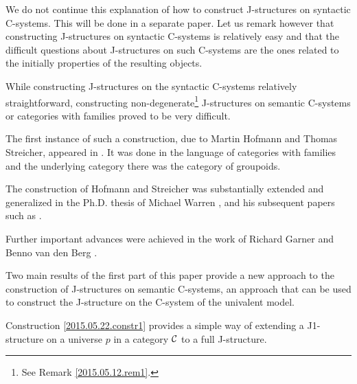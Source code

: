 \documentclass[12pt]{article}
\newcommand{\comment}[1]{}
\begin{document}
We do not continue this explanation of how to construct J-structures on syntactic C-systems. This will be done in a separate paper. Let us remark however that constructing J-structures on syntactic C-systems is relatively easy and that the difficult questions about J-structures on such C-systems are the ones related to the initially properties of the resulting objects. 

While constructing J-structures on the syntactic C-systems relatively straightforward, constructing non-degenerate\footnote{See Remark \ref{2015.05.12.rem1}.} J-structures on semantic C-systems or categories with families proved to be very difficult.

The first instance of such a construction, due to Martin Hofmann and Thomas Streicher, appeared in \cite{Hofmann1}. It was done in the language of categories with families and the underlying category there was the category of groupoids. 

The construction of Hofmann and Streicher was substantially extended and generalized in the Ph.D. thesis of Michael Warren \cite{WarrenThesisProsp},\cite{WarrenThesis} and his subsequent papers such as \cite{Warreninfty}. 

Further important advances were achieved in the work of Richard Garner and Benno van den Berg \cite{BergandGarner}. 

\comment{However the original expectation that it should be possible to construct C-systems or categories with families with J-structures corresponding to all Quillen closed model categories with sufficiently good properties have not been realized. In particular none of the previous methods provided a construction of a C-system whose underlying category is the category of simplicial sets and whose J-structure corresponds, in an appropriately defined sense,  to the standard closed model structure on this category.

This goal is still not fully realized in this paper since to achieve it one has to construct a Kan fibration with certain properties and discussing such a construction is outside of the scope of this paper. }

Two main results of the first part of this paper provide a new approach to the construction of J-structures on semantic C-systems, an approach that can be used to construct the J-structure on the C-system of the univalent model. 

Construction \ref{2015.05.22.constr1} provides a simple way of extending a J1-structure on a universe $p$ in a category $\cal C$ to a full J-structure. 
\end{document}
